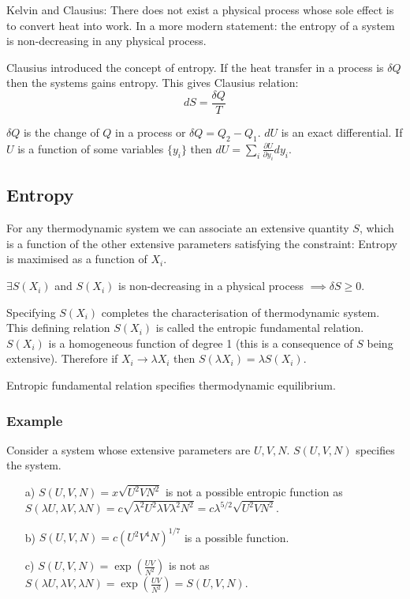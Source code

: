 Kelvin and Clausius: There does not exist a physical process whose sole effect is to convert heat into work. In a more modern statement: the entropy of a system is non-decreasing in any physical process.

Clausius introduced the concept of entropy. If the heat transfer in a process is $\delta Q$ then the systems gains entropy. This gives Clausius relation: $$dS = \frac{\delta Q}{T}$$

$\delta Q$ is the change of $Q$ in a process or $\delta Q = Q_2 - Q_1$. $dU$ is an exact differential. If $U$ is a function of some variables $\{y_i\}$ then $dU = \sum_i \frac{\partial U}{\partial y_i} d y_i$.

\subsection{Entropy}

For any thermodynamic system we can associate an extensive quantity $S$, which is a function of the other extensive parameters satisfying the constraint: Entropy is maximised as a function of $X_i$.

$\exists S(X_i)$ and $S(X_i)$ is non-decreasing in a physical process $\implies \delta S \geq 0$.

Specifying $S(X_i)$ completes the characterisation of thermodynamic system. This defining relation $S(X_i)$ is called the entropic fundamental relation. $S(X_i)$ is a homogeneous function of degree 1 (this is a consequence of $S$ being extensive). Therefore if $X_i \rightarrow \lambda X_i$ then $S(\lambda X_i) = \lambda S(X_i)$.

Entropic fundamental relation specifies thermodynamic equilibrium.

\subsubsection*{Example}

Consider a system whose extensive parameters are $U,V,N$. $S(U,V,N)$ specifies the system.

\begin{itemize}

\item[a)] $S(U,V,N) = x \sqrt{U^2 V N^2}$ is not a possible entropic function as $S(\lambda U, \lambda V, \lambda N) = c \sqrt{\lambda^2 U^2 \lambda V \lambda^2 N^2} = c \lambda^{5/2} \sqrt{U^2 V N^2}$.
\item[b)] $S(U,V,N) = c (U^2 V^4 N)^{1/7}$ is a possible function.
\item[c)] $S(U,V,N) = \exp \left (\frac{UV}{N^2}\right)$ is not as $S(\lambda U, \lambda V, \lambda N) = \exp \left (\frac{UV}{N^2}\right) = S(U,V,N)$.

\end{itemize}

